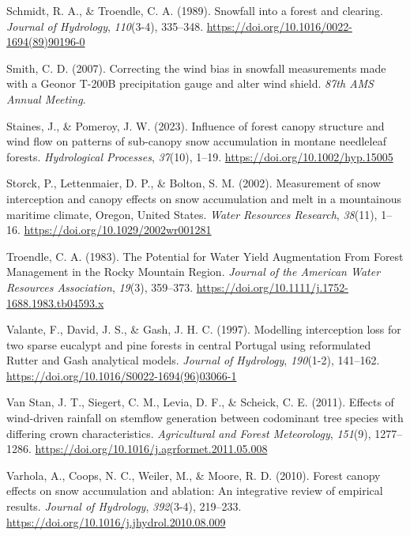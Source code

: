 \documentclass[
  letterpaper,
  DIV=11,
  numbers=noendperiod]{scrartcl}
\newlength{\cslhangindent}
\newenvironment{CSLReferences}[2] %
 {\begin{list}{}{%
  \setlength{\itemindent}{0pt}
  \setlength{\leftmargin}{0pt}
  \setlength{\parsep}{0pt}
  \ifodd #1
   \setlength{\leftmargin}{\cslhangindent}
   \setlength{\itemindent}{-1\cslhangindent}
  \fi
  \setlength{\itemsep}{#2\baselineskip}}}
 {\end{list}}
\begin{document}
\begin{CSLReferences}{1}{0}
Schmidt, R. A., \& Troendle, C. A. (1989). {Snowfall into a forest and
clearing}. \emph{Journal of Hydrology}, \emph{110}(3-4), 335--348.
\url{https://doi.org/10.1016/0022-1694(89)90196-0}

Smith, C. D. (2007). {Correcting the wind bias in snowfall measurements
made with a Geonor T-200B precipitation gauge and alter wind shield}.
\emph{87th AMS Annual Meeting}.

Staines, J., \& Pomeroy, J. W. (2023). {Influence of forest canopy
structure and wind flow on patterns of sub-canopy snow accumulation in
montane needleleaf forests}. \emph{Hydrological Processes},
\emph{37}(10), 1--19. \url{https://doi.org/10.1002/hyp.15005}

Storck, P., Lettenmaier, D. P., \& Bolton, S. M. (2002). {Measurement of
snow interception and canopy effects on snow accumulation and melt in a
mountainous maritime climate, Oregon, United States}. \emph{Water
Resources Research}, \emph{38}(11), 1--16.
\url{https://doi.org/10.1029/2002wr001281}

Troendle, C. A. (1983). {The Potential for Water Yield Augmentation From
Forest Management in the Rocky Mountain Region}. \emph{Journal of the
American Water Resources Association}, \emph{19}(3), 359--373.
\url{https://doi.org/10.1111/j.1752-1688.1983.tb04593.x}

Valante, F., David, J. S., \& Gash, J. H. C. (1997). {Modelling
interception loss for two sparse eucalypt and pine forests in central
Portugal using reformulated Rutter and Gash analytical models}.
\emph{Journal of Hydrology}, \emph{190}(1-2), 141--162.
\url{https://doi.org/10.1016/S0022-1694(96)03066-1}

Van Stan, J. T., Siegert, C. M., Levia, D. F., \& Scheick, C. E. (2011).
{Effects of wind-driven rainfall on stemflow generation between
codominant tree species with differing crown characteristics}.
\emph{Agricultural and Forest Meteorology}, \emph{151}(9), 1277--1286.
\url{https://doi.org/10.1016/j.agrformet.2011.05.008}

Varhola, A., Coops, N. C., Weiler, M., \& Moore, R. D. (2010). {Forest
canopy effects on snow accumulation and ablation: An integrative review
of empirical results}. \emph{Journal of Hydrology}, \emph{392}(3-4),
219--233. \url{https://doi.org/10.1016/j.jhydrol.2010.08.009}


\end{CSLReferences}
\end{document}
